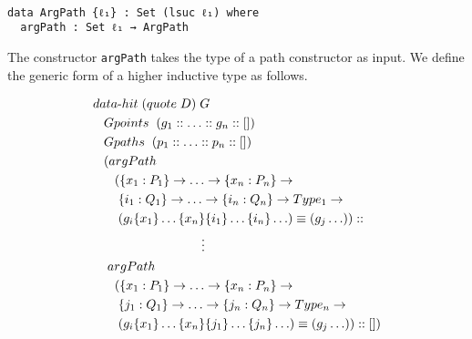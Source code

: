 \documentclass[sigplan,10pt]{acmart}
\begin{document}
\begin{center}
\begingroup
\begin{BVerbatim}

data ArgPath {ℓ₁} : Set (lsuc ℓ₁) where
  argPath : Set ℓ₁ → ArgPath
\end{BVerbatim}
\endgroup
\end{center}

The constructor {\tt argPath} takes the type of a path constructor as input. We define the generic form of a higher inductive type as follows.

\begin{center}
\begingroup
\fontsize{7.9pt}{0pt}\selectfont
\begin{align}
& data{\text -}hit \hspace {0.1cm} (quote \hspace {0.1cm} D) \hspace {0.1cm} G \nonumber \\
  & \hspace {0.3cm} Gpoints \hspace {0.2cm} (g_1 ::  \ldots :: g_n :: []) \nonumber \\
  & \hspace {0.3cm} Gpaths  \hspace {0.2cm} (p_1 :: \ldots :: p_n :: []) \nonumber \\
  & \hspace {0.3cm} (argPath \nonumber \\
  & \hspace {0.6cm} (\{x_1:P_1\} \rightarrow \ldots \rightarrow \{x_n:P_n\} \rightarrow \nonumber \\
  & \hspace {0.7cm} \{i_1:Q_1\} \rightarrow \ldots \rightarrow \{i_n:Q_n\} \rightarrow Type_1 \rightarrow \nonumber \\
  & \hspace {0.7cm} (g_i \{x_1\} \ldots \{x_n\} \{i_1\} \ldots \{i_n\} \ldots) \equiv (g_j \ldots)) :: \nonumber \\
  & \hspace {3cm} \vdots \nonumber \\
  & \hspace {0.4cm} argPath \nonumber \\
  & \hspace {0.6cm} (\{x_1:P_1\} \rightarrow \ldots \rightarrow \{x_n:P_n\} \rightarrow \nonumber \\
  & \hspace {0.7cm} \{j_1:Q_1\} \rightarrow \ldots \rightarrow \{j_n:Q_n\} \rightarrow Type_n \rightarrow \nonumber \\
  & \hspace {0.7cm} (g_i \{x_1\} \ldots \{x_n\} \{j_1\} \ldots \{j_n\} \ldots) \equiv (g_j \ldots)) :: [])\nonumber \\ \nonumber
\end{align}
\endgroup
\end{center}
\normalsize
\end{document}
